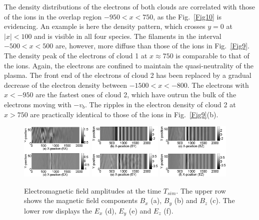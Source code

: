 \documentclass[structabstract]{aa}
\begin{document}
The density distributions of the electrons of both clouds are correlated 
with those of the ions in the overlap region $-950 < x < 750$, as the 
Fig.~\ref{Fig10} is evidencing. An example is here the density pattern, 
which crosses $y=0$ at $|x| < 100$ and is visible in all four species. 
The filaments in the interval $-500<x<500$ are, however, more diffuse 
than those of the ions in Fig.~\ref{Fig9}. The density peak of the 
electrons of cloud 1 at $x\approx 750$ is comparable to that of the ions. 
Again, the electrons are confined to maintain the quasi-neutrality of 
the plasma. The front end of the electrons of cloud 2 has been 
replaced by a gradual decrease of the electron density between $-1500 
< x < -800$. The electrons with $x<-950$ are the fastest ones of cloud 2, 
which have outrun the bulk of the electrons moving with $-v_b$. The 
ripples in the electron density of cloud 2 at $x>750$ are practically 
identical to those of the ions in Fig.~\ref{Fig9}(b).

\begin{figure}
\centering
\includegraphics[width=0.31\textwidth]{Fig11a.eps}
\includegraphics[width=0.31\textwidth]{Fig11b.eps}
\includegraphics[width=0.31\textwidth]{Fig11c.eps}
\caption{Electromagnetic field amplitudes at the time $T_{sim}$. The upper 
row shows the magnetic field components $B_x$ (a), $B_y$ (b) and $B_z$ (c). 
The lower row displays the $E_x$ (d), $E_y$ (e) and $E_z$ (f).}\label{Fig11}
\end{figure}
\end{document}

